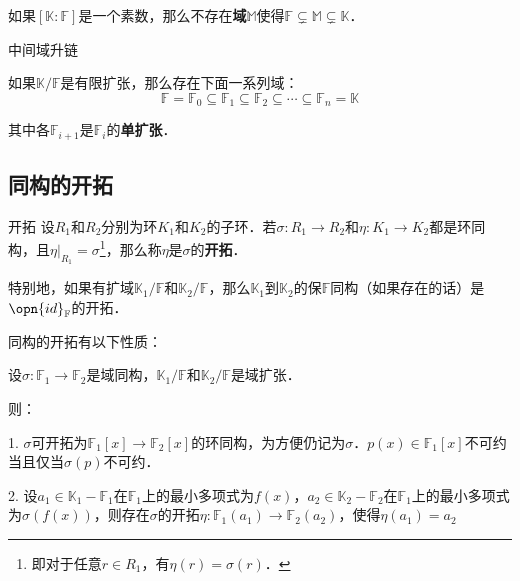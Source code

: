 \begin{corollary}{}
如果$[\mathbb{K}:\mathbb{F}]$是一个素数，那么不存在\textbf{域}$\mathbb{M}$使得$\mathbb{F}\subsetneq\mathbb{M}\subsetneq\mathbb{K}$．
\end{corollary}


\begin{corollary}{中间域升链}

如果$\mathbb{K}/\mathbb{F}$是有限扩张，那么存在下面一系列域：
\begin{equation}
\mathbb{F}=\mathbb{F}_0\subseteq\mathbb{F}_1\subseteq\mathbb{F}_2\subseteq\cdots\subseteq\mathbb{F}_n=\mathbb{K}
\end{equation}

其中各$\mathbb{F}_{i+1}$是$\mathbb{F}_i$的\textbf{单扩张}．

\end{corollary}





\subsection{同构的开拓}

\begin{definition}{开拓}
设$R_1$和$R_2$分别为环$K_1$和$K_2$的子环．若$\sigma:R_1\to R_2$和$\eta:K_1\to K_2$都是环同构，且$\eta|_{R_1}=\sigma$\footnote{即对于任意$r\in R_1$，有$\eta(r)=\sigma(r)$．}，那么称$\eta$是$\sigma$的\textbf{开拓}．
\end{definition}

特别地，如果有扩域$\mathbb{K}_1/\mathbb{F}$和$\mathbb{K}_2/\mathbb{F}$，那么$\mathbb{K}_1$到$\mathbb{K}_2$的保$\mathbb{F}$同构（如果存在的话）是$\opn{id}_\mathbb{F}$的开拓．

同构的开拓有以下性质：

\begin{theorem}{}\label{FldExp_the4}
设$\sigma:\mathbb{F}_1\to\mathbb{F}_2$是域同构，$\mathbb{K}_1/\mathbb{F}$和$\mathbb{K}_2/\mathbb{F}$是域扩张．

则：

1. $\sigma$可开拓为$\mathbb{F}_1[x]\to\mathbb{F}_2[x]$的环同构，为方便仍记为$\sigma$．$p(x)\in\mathbb{F}_1[x]$不可约当且仅当$\sigma(p)$不可约．

2. 设$a_1\in\mathbb{K}_1-\mathbb{F}_1$在$\mathbb{F}_1$上的最小多项式为$f(x)$，$a_2\in\mathbb{K}_2-\mathbb{F}_2$在$\mathbb{F}_1$上的最小多项式为$\sigma(f(x))$，则存在$\sigma$的开拓$\eta:\mathbb{F}_1(a_1)\to \mathbb{F}_2(a_2)$，使得$\eta(a_1)=a_2$
\end{theorem}

